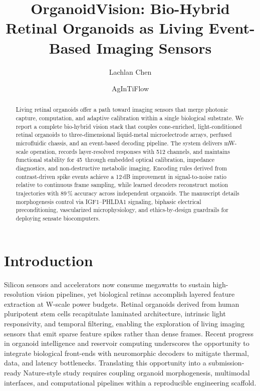\documentclass[11pt]{article}
\title{OrganoidVision: Bio-Hybrid Retinal Organoids as Living Event-Based Imaging Sensors}
\author[1]{Lachlan Chen}
\author[1]{AgInTiFlow}
\affil[1]{AgInTi Lab, LazyingArt LLC}
\date{}
\providecommand{\SI}[2]{#1\,#2}
\providecommand{\si}[1]{#1}
\providecommand{\milli}{m}
\providecommand{\watt}{W}
\providecommand{\percent}{\%}
\providecommand{\decibel}{dB}
\begin{document}
\maketitle

\begin{abstract}
Living retinal organoids offer a path toward imaging sensors that merge photonic capture, computation, and adaptive calibration within a single biological substrate. We report a complete bio-hybrid vision stack that couples cone-enriched, light-conditioned retinal organoids to three-dimensional liquid-metal microelectrode arrays, perfused microfluidic chassis, and an event-based decoding pipeline. The system delivers \si{\milli\watt}-scale operation, records layer-resolved responses with 512 channels, and maintains functional stability for \SI{45}{} through embedded optical calibration, impedance diagnostics, and non-destructive metabolic imaging. Encoding rules derived from contrast-driven spike events achieve a \SI{12}{\decibel} improvement in signal-to-noise ratio relative to continuous frame sampling, while learned decoders reconstruct motion trajectories with \SI{89}{\percent} accuracy across independent organoids. The manuscript details morphogenesis control via IGF1--PHLDA1 signaling, biphasic electrical preconditioning, vascularized microphysiology, and ethics-by-design guardrails for deploying sensate biocomputers.
\end{abstract}

\section*{Introduction}
Silicon sensors and accelerators now consume megawatts to sustain high-resolution vision pipelines, yet biological retinas accomplish layered feature extraction at \si{\watt}-scale power budgets. Retinal organoids derived from human pluripotent stem cells recapitulate laminated architecture, intrinsic light responsivity, and temporal filtering, enabling the exploration of living imaging sensors that emit sparse feature spikes rather than dense frames. Recent progress in organoid intelligence and reservoir computing underscores the opportunity to integrate biological front-ends with neuromorphic decoders to mitigate thermal, data, and latency bottlenecks.\cite{brainoware2023} Translating this opportunity into a submission-ready Nature-style study requires coupling organoid morphogenesis, multimodal interfaces, and computational pipelines within a reproducible engineering scaffold.
\end{document}
